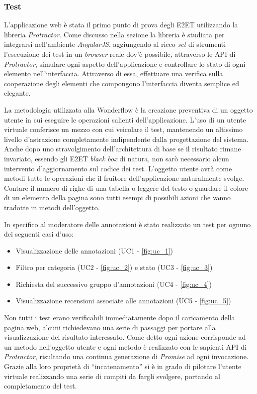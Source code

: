 \subsubsection{Test}
L'applicazione web è stata il primo punto di prova degli \gls{E2ET} utilizzando
la libreria \textit{Protractor}. Come discusso nella sezione
 la libreria è studiata per integrarsi nell'ambiente
\textit{AngularJS}, aggiungendo al ricco \textit{set} di strumenti l'esecuzione
dei test in un \textit{browser} reale dov'è possibile, attraverso le \gls{API}
di \textit{Protractor}, simulare ogni aspetto dell'applicazione e controllare
lo stato di ogni elemento nell'interfaccia. Attraverso di essa, effettuare una
verifica sulla cooperazione degli elementi che compongono l'interfaccia diventa
semplice ed elegante.

La metodologia utilizzata alla Wonderflow è la creazione preventiva di un
oggetto utente in cui eseguire le operazioni salienti dell'applicazione. L'uso
di un utente virtuale conferisce un mezzo con cui veicolare il test, mantenendo
un altissimo livello d'astrazione completamente indipendente dalla
progettazione del sistema. Anche dopo uno stravolgimento dell'architettura di
base se il risultato rimane invariato, essendo gli \gls{E2ET} \textit{black box}
di natura, non sarò necessario alcun intervento d'aggiornamento sul codice
dei test. L'oggetto utente avrà come metodi tutte le operazioni che il fruitore
dell'applicazione naturalmente svolge. Contare il numero di righe di una
tabella o leggere del testo o guardare il colore di un elemento della pagina
sono tutti esempi di possibili azioni che vanno tradotte in metodi dell'oggetto.

In specifico al moderatore delle annotazioni è stato realizzato un test per
ognuno dei seguenti casi d'uso:
\begin{itemize}
\item Visualizzazione delle annotazioni (UC1 - \ref{fig:uc_1})
\item Filtro per categoria (UC2 - \ref{fig:uc_2}) e stato (UC3 - \ref{fig:uc_3})
\item Richiesta del successivo gruppo d'annotazioni (UC4 - \ref{fig:uc_4})
\item Visualizzazione recensioni associate alle annotazioni (UC5 -
\ref{fig:uc_5})
\end{itemize}

Non tutti i test erano verificabili immediatamente dopo il caricamento della
pagina web, alcuni richiedevano una serie di passaggi per portare alla
visualizzazione del risultato interessato. Come detto ogni azione corrisponde
ad un metodo nell'oggetto utente e ogni metodo è realizzato con le sapienti
\gls{API} di \textit{Protractor}, risultando una continua generazione di
\textit{Promise} ad ogni invocazione. Grazie alla loro proprietà di
``incatenamento'' si è in grado di pilotare l'utente virtuale realizzando una
serie di compiti da fargli svolgere, portando al completamento del test.

